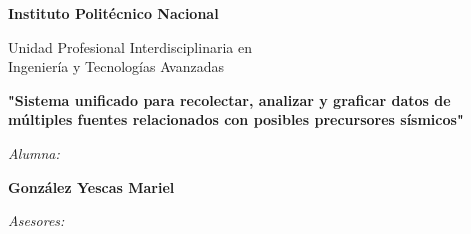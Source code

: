 \begin{titlepage}
         \begin{center}
            
              \vfill
              
            \begin{center}
                    {\Large \bf Instituto Politécnico Nacional }
                    
                    \vfill
                    
                    Unidad Profesional Interdisciplinaria en \\
                    Ingeniería y Tecnologías Avanzadas
                    
                    \vfill
            \end{center}
            
              \vfill
        
        
              \textbf{\Large "Sistema unificado para recolectar, analizar y graficar datos de múltiples fuentes relacionados con posibles precursores sísmicos"}\\[10pt]
            
              \vfill
            
              {\em  Alumna:} 
            
              \vfill
            
              {\large \bf González Yescas Mariel} \\[10pt] 
                
              \vfill
          
          {\em  Asesores:} 


\end{center}
\end{titlepage}
